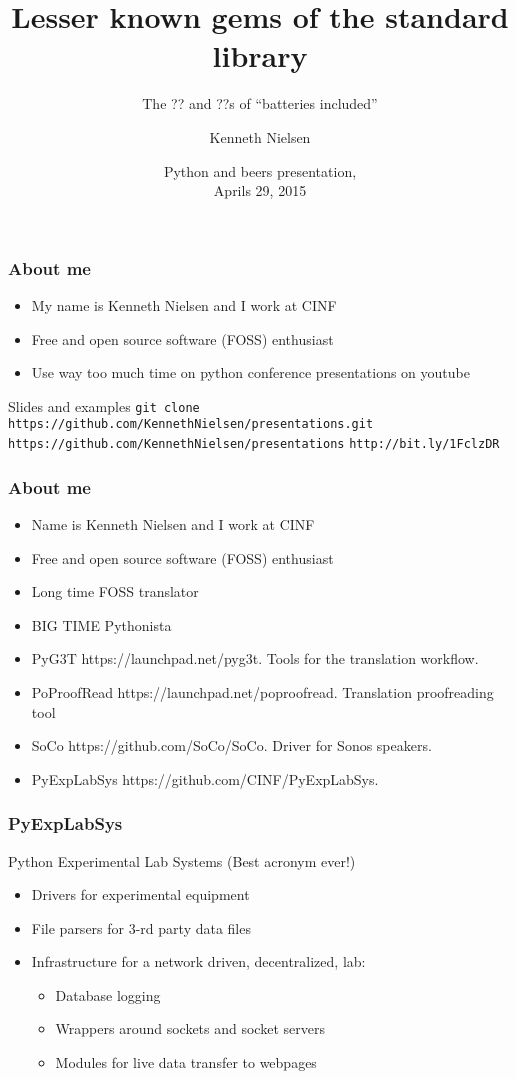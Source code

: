 \documentclass{beamer}
\title{Lesser known gems of the standard library}
\subtitle{The ?? and ??s of ``batteries included''}
\author{Kenneth Nielsen\inst{1}}
\institute
{
  \inst{1}%
  Center for Individual Nanoparticle Functionality (CINF)\\
  Institute of Physics\\
  Technical University of Denmark (DTU)
}
\date{
  Python and beers presentation,\\
  Aprils 29, 2015}
\begin{document}
\frame{\titlepage}

\begin{frame}
  \frametitle{About me}
  \begin{itemize}
    \item My name is Kenneth Nielsen and I work at CINF
    \item Free and open source software (FOSS) enthusiast
    \item Use way too much time on python conference presentations on
      youtube
  \end{itemize}
  \begin{block}{Slides and examples}
    \center
    \footnotesize
    \texttt{git clone https://github.com/KennethNielsen/presentations.git}\newline
    \newline
    \texttt{https://github.com/KennethNielsen/presentations}
    \texttt{http://bit.ly/1FclzDR}
  \end{block}
\end{frame}

\begin{frame}
  \frametitle{About me}
  \begin{itemize}
    \item Name is Kenneth Nielsen and I work at CINF
    \item Free and open source software (FOSS) enthusiast
    \item Long time FOSS translator
    \item BIG TIME Pythonista
    \item PyG3T https://launchpad.net/pyg3t. Tools for the translation
      workflow.
    \item PoProofRead https://launchpad.net/poproofread. Translation
      proofreading tool
    \item SoCo https://github.com/SoCo/SoCo. Driver for Sonos speakers.
    \item PyExpLabSys https://github.com/CINF/PyExpLabSys.
  \end{itemize}
\end{frame}

\begin{frame}
  \frametitle{PyExpLabSys}
  {\color{blue}Py}thon {\color{blue}Exp}erimental {\color{blue}Lab}
  {\color{blue}Sys}tems (Best acronym ever!)
  \begin{itemize}
  \item Drivers for experimental equipment
  \item File parsers for 3-rd party data files
  \item Infrastructure for a network driven, decentralized, lab:
    \begin{itemize}
    \item Database logging
    \item Wrappers around sockets and socket servers
    \item Modules for live data transfer to webpages
    \end{itemize}
  \end{itemize}
\end{frame}
\end{document}
